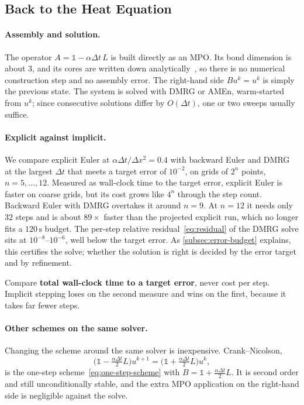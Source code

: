 \subsection{Back to the Heat Equation}
\label{subsec:heat-implicit-results}

\paragraph{Assembly and solution.}
The operator $A = \mathbb{1} - \alpha \Delta t\, L$ is built directly as an MPO.
Its bond dimension is about $3$, and its cores are written down
analytically~\cite{Kazeev2012}, so there is no numerical construction step and
no assembly error. The right-hand side $B u^k = u^k$ is simply the previous
state. The system is solved with DMRG or AMEn, warm-started from $u^k$; since
consecutive solutions differ by $O(\Delta t)$, one or two sweeps usually suffice.

\paragraph{Explicit against implicit.}
We compare explicit Euler at $\alpha\Delta t/\Delta x^2 = 0.4$ with backward
Euler and DMRG at the largest $\Delta t$ that meets a target error of $10^{-2}$,
on grids of $2^n$ points, $n = 5, \dots, 12$. Measured as wall-clock time to the
target error, explicit Euler is faster on coarse grids, but its cost grows like
$4^n$ through the step count. Backward Euler with DMRG overtakes it around
$n = 9$. At $n = 12$ it needs only $32$ steps and is about $89\times$ faster than
the projected explicit run, which no longer fits a $120\,\mathrm{s}$ budget. The
per-step relative residual~\eqref{eq:residual} of the DMRG solve sits at
$10^{-8}$--$10^{-6}$, well below the target error. As
\cref{subsec:error-budget} explains, this certifies the solve; whether the
solution is right is decided by the error target and by refinement.

\begin{remark}
  Compare \textbf{total wall-clock time to a target error}, never cost per step.
  Implicit stepping loses on the second measure and wins on the first, because
  it takes far fewer steps.
\end{remark}

\paragraph{Other schemes on the same solver.}
Changing the scheme around the same solver is inexpensive. Crank--Nicolson,
\begin{equation*}
  \bigl(\mathbb{1} - \tfrac{\alpha\Delta t}{2}L\bigr)u^{k+1}
  = \bigl(\mathbb{1} + \tfrac{\alpha\Delta t}{2}L\bigr)u^{k},
\end{equation*}
is the one-step scheme~\eqref{eq:one-step-scheme} with
$B = \mathbb{1} + \tfrac{\alpha\Delta t}{2}L$. It is second order and still
unconditionally stable, and the extra MPO application on the right-hand side is
negligible against the solve.

